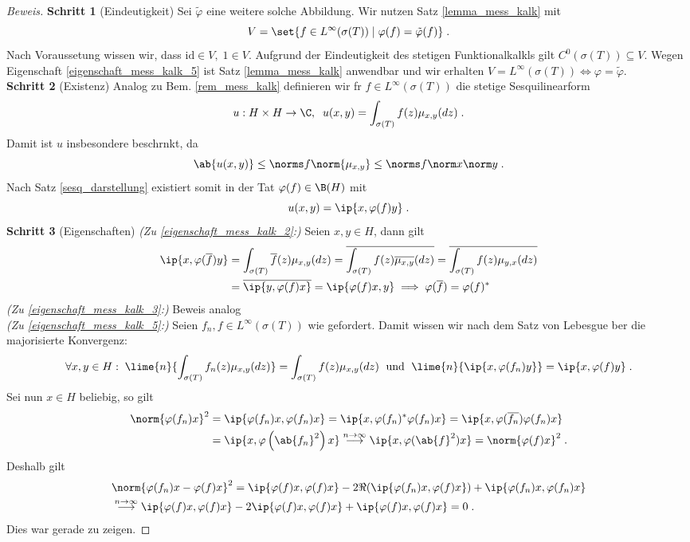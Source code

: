 \begin{proof}[Beweis]
	\textbf{Schritt 1} (Eindeutigkeit) Sei \(\tilde\varphi\) eine weitere solche Abbildung. Wir nutzen Satz \ref{lemma_mess_kalk} mit
	\[V = \set{f\in L^\infty(\sigma(T))\;\vert\; \varphi(f) = \tilde\varphi(f)}\;.\]
	Nach Voraussetung wissen wir, dass \(\text{id} \in V,\; 1 \in V\). Aufgrund der Eindeutigkeit des stetigen Funktionalkalk\us ls gilt \(C^0(\sigma(T)) \subseteq V\). Wegen Eigenschaft \ref{eigenschaft_mess_kalk_5} ist Satz \ref{lemma_mess_kalk} anwendbar und wir erhalten \(V = L^\infty(\sigma(T)) \iff \varphi = \tilde \varphi\).\\
	\textbf{Schritt 2} (Existenz) Analog zu Bem. \ref{rem_mess_kalk} definieren wir f\us r \(f\in L^\infty(\sigma(T))\) die stetige Sesquilinearform
	\[u: H\times H \to \C,\;\; u(x,y) = \int_{\sigma(T)} f(z) \mu_{x,y}(dz)\;.\]
	Damit ist $u$ insbesondere beschr\as nkt, da
	\[\ab{u(x,y)} \leq \norms f \norm{\mu_{x,y}} \leq \norms f \norm x\norm y\;.\]
	Nach Satz \ref{sesq_darstellung} existiert somit in der Tat \(\varphi(f) \in \B(H)\) mit
	\[u(x,y) = \ip{x,\varphi(f)y}\;.\]
	\textbf{Schritt 3} (Eigenschaften) \textit{(Zu \ref{eigenschaft_mess_kalk_2}:)} Seien \(x,y\in H\), dann gilt
	\begin{align*}
		\ip{x,\varphi(\overline f)y} &= \int_{\sigma(T)} \overline{f}(z) \mu_{x,y}(dz)  = \overline{\int_{\sigma(T)} f(z) \overline{\mu_{x,y}}(dz)} = \overline{\int_{\sigma(T)} f(z) \mu_{y,x}(dz)} \\&= \overline{\ip{y, \varphi(f)x}} = \ip{\varphi(f)x,y} \implies \varphi(\overline f) =\varphi(f)^*
	\end{align*}
	\textit{(Zu \ref{eigenschaft_mess_kalk_3}:)} Beweis analog\\
	\textit{(Zu \ref{eigenschaft_mess_kalk_5}:)} Seien \(f_n, f \in L^\infty(\sigma(T))\) wie gefordert. Damit wissen wir nach dem Satz von Lebesgue \us ber die majorisierte Konvergenz:
	\[\forall x, y \in H:\; \lime{n}{\int_{\sigma(T)} f_n(z) \mu_{x,y}(dz)} = \int_{\sigma(T)} f(z) \mu_{x,y}(dz)\;\text{ und }\;\lime{n}{\ip{x,\varphi(f_n)y}} = \ip{x, \varphi(f)y}\;.\]
	Sei nun \(x\in H\) beliebig, so gilt
	\begin{align*}
		\norm{\varphi(f_n)x}^2 &= \ip{\varphi(f_n)x, \varphi(f_n)x} = \ip{x, \varphi(f_n)^*\varphi(f_n)x} = \ip{x, \varphi(\overline{f_n})\varphi(f_n)x} \\
		&= \ip{x,\varphi\left(\ab{f_n}^2\right)x} \overset{n\to\infty}{\longrightarrow} \ip{x, \varphi(\ab{f}^2)x} = \norm{\varphi(f)x}^2\;.
	\end{align*}
	Deshalb gilt
	\begin{align*}
		&\norm{\varphi(f_n)x -\varphi(f)x}^2 = \ip{\varphi(f)x, \varphi(f)x} - 2\Re(\ip{\varphi(f_n)x, \varphi(f)x}) + \ip{\varphi(f_n)x, \varphi(f_n)x}\\
		& \overset{n\to\infty}{\longrightarrow} \ip{\varphi(f)x, \varphi(f)x} -2 \ip{\varphi(f)x, \varphi(f)x} + \ip{\varphi(f)x, \varphi(f)x} = 0\;.
	\end{align*}
	\happybegin
	Dies war gerade zu zeigen.\hfill\happyend
\end{proof}

